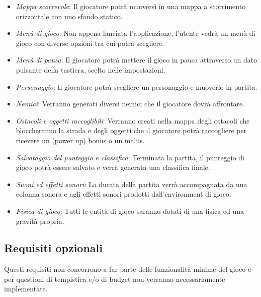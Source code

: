 \begin{itemize}
	\item \textsf{\small \emph{Mappa scorrevole}: Il giocatore potrà muoversi in una mappa a scorrimento orizzontale con uno sfondo statico.}
	\item \textsf{\small \emph{Menù di gioco}: Non appena lanciata l'applicazione, l'utente vedrà un menù di gioco con diverse opzioni tra cui potrà scegliere.}
	\item \textsf{\small \emph{Menù di pausa}: Il giocatore potrà mettere il gioco in pausa attraverso un dato pulsante della tastiera, scelto nelle impostazioni.}
	\item \textsf{\small \emph{Personaggio}: Il giocatore potrà scegliere un personaggio e muoverlo in partita.}
	\item \textsf{\small \emph{Nemici}: Verranno generati diversi nemici che il giocatore dovrà affrontare.}
	\item \textsf{\small \emph{Ostacoli e oggetti raccoglibili}: Verranno creati nella mappa degli ostacoli che bloccheranno la strada e degli oggetti che il giocatore potrà raccogliere per ricevere un (power up) bonus o un malus.}
	\item \textsf{\small \emph{Salvataggio del punteggio e classifica}: Terminata la partita, il punteggio di gioco potrà essere salvato e verrà generata una classifica finale.}
	\item \textsf{\small \emph{Suoni ed effetti sonori}: La durata della partita verrà accompagnata da una colonna sonora e agli effetti sonori prodotti dall'environment di gioco.}
	\item \textsf{\small \emph{Fisica di gioco}: Tutti le entità di gioco saranno dotati di una fisica ed una gravità propria.}
\end{itemize}

\subsection{Requisiti opzionali}

\textsf{\small Questi requisiti non concorrono a far parte delle funzionalità minime del gioco e per questioni di tempistica e/o di budget non verranno necessariamente implementate.}\\

